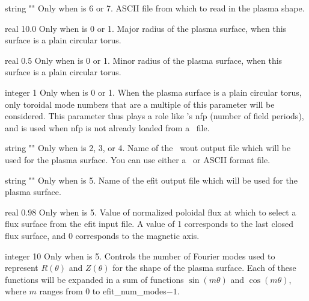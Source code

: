 \myhrule

{string}
{{\ttfamily ""}}
{Only when  is 6 or 7.}
{ASCII file from which to read in the plasma shape.}

\myhrule

{real}
{10.0}
{Only when  is 0 or 1.}
{Major radius of the plasma surface, when this surface is a plain circular torus.}

\myhrule

{real}
{0.5}
{Only when  is 0 or 1.}
{Minor radius of the plasma surface, when this surface is a plain circular torus.}

\myhrule

{integer}
{1}
{Only when  is 0 or 1.}
{When the plasma surface is a plain circular torus, only toroidal mode numbers that are a multiple of this parameter will be considered.
This parameter thus plays a role like \vmec's {\ttfamily nfp} (number of field periods),
and is used when {\ttfamily nfp} is not already loaded from a \vmec~file.}

\myhrule

{string}
{{\ttfamily ""}}
{Only when  is 2, 3, or 4.}
{Name of the \vmec~{\ttfamily wout} output file which will be used for the plasma surface.
You can use either a \netCDF~or {\ttfamily ASCII} format file.}

\myhrule

{string}
{{\ttfamily ""}}
{Only when  is 5.}
{Name of the {\ttfamily efit} output file which will be used for the plasma surface.}

\myhrule

{real}
{0.98}
{Only when  is 5.}
{Value of normalized poloidal flux at which to select a flux surface from the {\ttfamily efit} input file.
A value of 1 corresponds to the last closed flux surface, and 0 corresponds to the magnetic axis.}

\myhrule

{integer}
{10}
{Only when  is 5.}
{Controls the number of Fourier modes used to represent $R(\theta)$ and $Z(\theta)$ for the shape of
the plasma surface. Each of these functions will be expanded in a sum of functions $\sin(m\theta)$ and $\cos(m\theta)$,
where $m$ ranges from 0 to {\ttfamily efit\_num\_modes}$-1$.}

